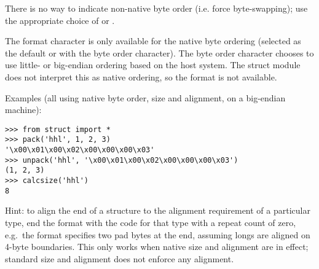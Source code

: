 There is no way to indicate non-native byte order (i.e. force
byte-swapping); use the appropriate choice of \character{<} or
\character{>}.

The  format character is only available for the native
byte ordering (selected as the default or with the  byte
order character). The byte order character \character{=} chooses to
use little- or big-endian ordering based on the host system. The
struct module does not interpret this as native ordering, so the
 format is not available.

Examples (all using native byte order, size and alignment, on a
big-endian machine):

\begin{verbatim}
>>> from struct import *
>>> pack('hhl', 1, 2, 3)
'\x00\x01\x00\x02\x00\x00\x00\x03'
>>> unpack('hhl', '\x00\x01\x00\x02\x00\x00\x00\x03')
(1, 2, 3)
>>> calcsize('hhl')
8
\end{verbatim}

Hint: to align the end of a structure to the alignment requirement of
a particular type, end the format with the code for that type with a
repeat count of zero, e.g.\ the format  specifies two
pad bytes at the end, assuming longs are aligned on 4-byte boundaries.
This only works when native size and alignment are in effect;
standard size and alignment does not enforce any alignment.

\begin{seealso}
\end{seealso}
